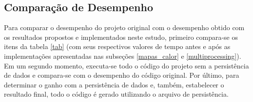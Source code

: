 \documentclass[12pt]{article}
\begin{document}
\subsection{Comparação de Desempenho}
\label{comparacao}


Para comparar o desempenho do projeto original com o desempenho obtido com os resultados propostos e implementados neste estudo, primeiro compara-se os itens da tabela \ref{tab} (com seus respectivos valores de tempo antes e após as implementações apresentadas nas subseções \ref{mapas_calor} e \ref{multiprocessing}). Em um segundo momento, executa-se todo o código do projeto sem a persistência de dados e compara-se com o desempenho do código original. Por último, para determinar o ganho com a persistência de dados e, também, estabelecer o resultado final, todo o código é gerado utilizando o arquivo de persistência.



\end{document}
